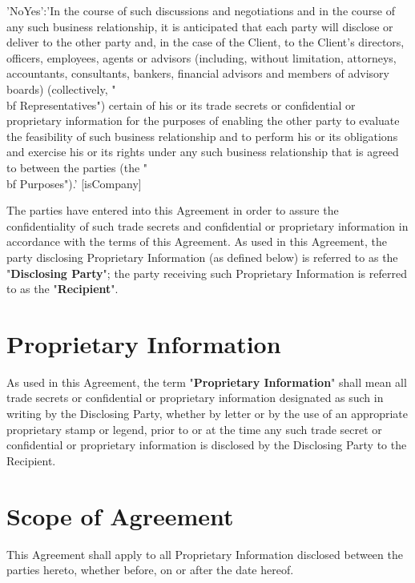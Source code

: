 \documentclass[12pt]{article}
\begin{document}
{{        'NoYes':'In the course of such discussions and negotiations and in the course of any such business relationship, it is anticipated that each party will disclose or deliver to the other party and, in the case of the Client, to the Client’s directors, officers, employees, agents or advisors (including, without limitation, attorneys, accountants, consultants, bankers, financial advisors and members of advisory boards) (collectively, "{\\bf Representatives}") certain of his or its trade secrets or confidential or proprietary information for the purposes of enabling the other party to evaluate the feasibility of such business relationship and to perform his or its obligations and exercise his or its rights under any such business relationship that is agreed to between the parties (the 	"{\\bf Purposes}").'
    }[isCompany]
}

The parties have entered into this Agreement in order to assure the confidentiality of such trade secrets and confidential or proprietary information in accordance with the terms of this Agreement.  As used in this Agreement, the party disclosing Proprietary Information (as defined below) is referred to as the "{\bf Disclosing Party}"; the party receiving such Proprietary Information is referred to as the "{\bf Recipient}".

\section{Proprietary Information}
As used in this Agreement, the term "{\bf Proprietary Information}" shall mean all trade secrets or confidential or proprietary information designated as such in writing by the Disclosing Party, whether by letter or by the use of an appropriate proprietary stamp or legend, prior to or at the time any such trade secret or confidential or proprietary information is disclosed by the Disclosing Party to the Recipient.

\section{Scope of Agreement}
This Agreement shall apply to all Proprietary Information disclosed between the parties hereto, whether before, on or after the date hereof.
\end{document}

